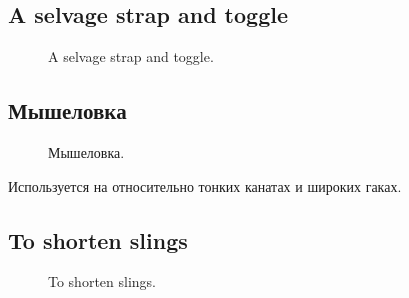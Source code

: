 \subsection{A selvage strap and toggle}

\begin{figure}[H]\centering
	\begin{minipage}{1\linewidth}
		\begin{center}
			\tcbox[enhanced jigsaw,colframe=black,opacityframe=0.5,opacityback=0.5]
			{\centering{}}
		\end{center}
	\end{minipage}
\caption{A selvage strap and toggle.}
\label{ris:A_selvage_strap_and_toggle}
\end{figure}


\subsection{Мышеловка}

\begin{figure}[H]\centering
	\begin{minipage}{1\linewidth}
		\begin{center}
			\tcbox[enhanced jigsaw,colframe=black,opacityframe=0.5,opacityback=0.5]
			{\centering{}}
		\end{center}
	\end{minipage}
\caption{Мышеловка.}
\label{ris:Myshelovka}
\end{figure}

Используется на относительно тонких канатах и широких гаках.

\subsection{To shorten slings}

\begin{figure}[H]\centering
	\subfloat[Завязывание]{\label{ris:To_shorten_slings_1}
	\tcbox[enhanced jigsaw,colframe=black,opacityframe=0.5,opacityback=0.5]
		{\centering
			}
		}
\hfil
	\subfloat[Результат]{\label{ris:To_shorten_slings_2}
	\tcbox[enhanced jigsaw,colframe=black,opacityframe=0.5,opacityback=0.5]
		{\centering
			}
		}
	\caption{To shorten slings.}\label{ris:To_shorten_slings}
\end{figure}

